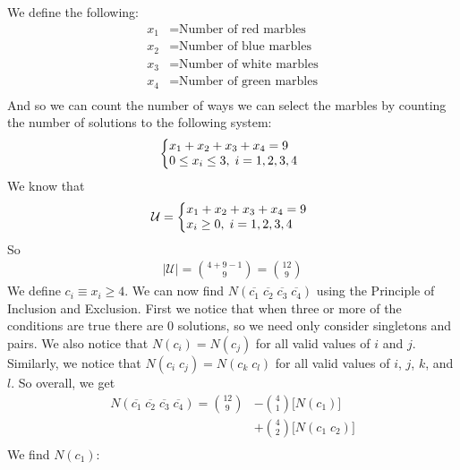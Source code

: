 \documentclass{article}
\begin{document}
\section{} %
We define the following:
\begin{align*}
	x_1&=\text{Number of red marbles}\\
	x_2&=\text{Number of blue marbles}\\
	x_3&=\text{Number of white marbles}\\
	x_4&=\text{Number of green marbles}\\
\end{align*}
And so we can count the number of ways we can select the marbles by counting
the number of solutions to the following system:
\begin{equation*}
	\left\{
	\begin{array}{@{}ll@{}}
		x_1+x_2+x_3+x_4=9\\
		0\le{x_i}\le3,\;i=1,2,3,4
	\end{array}\right.
\end{equation*}
We know that
\begin{equation*}
	\mathcal{U}=\left\{
	\begin{array}{@{}ll@{}}
		x_1+x_2+x_3+x_4=9\\
		x_i\ge0,\;i=1,2,3,4
	\end{array}\right.
\end{equation*}
So
\begin{align*}
	|\mathcal{U}|=\binom{4+9-1}{9}
	=\binom{12}{9}
\end{align*}
We define $c_i\equiv{x_i\ge4}$. We can now find
$N(\overline{c_1}\;\overline{c_2}\;\overline{c_3}\;\overline{c_4})$ using the
Principle of Inclusion and Exclusion. First we notice that when three or more
of the conditions are true there are 0 solutions, so we need only consider
singletons and pairs. We also notice that $N(c_i)=N(c_j)$ for all valid values
of $i$ and $j$. Similarly, we notice that $N(c_i\;c_j)=N(c_k\;c_l)$ for all
valid values of $i$, $j$, $k$, and $l$. So overall, we get
\begin{align*}
	N(\overline{c_1}\;\overline{c_2}\;\overline{c_3}\;\overline{c_4})=
	\binom{12}{9}
	&-\binom{4}{1}\bigg[N(c_1)\bigg]\\
	&+\binom{4}{2}\bigg[N(c_1\;c_2)\bigg]\\
\end{align*}
We find $N(c_1)$:
\end{document}
